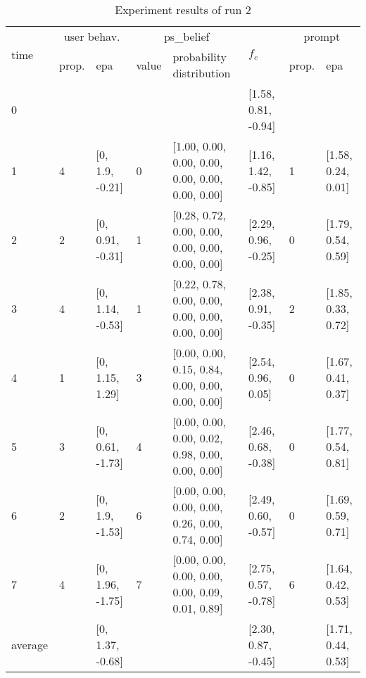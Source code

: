 \begin{table}[htbp]\footnotesize
\caption{Experiment results of run 2}
\begin{tabular}{|p{0.4cm}|p{0.6cm}|l|p{0.6cm}|p{3.3cm}|l|p{0.6cm}|l|}
\hline

\multirow{2}{*}{time} & \multicolumn{2}{c|}{user behav.} & \multicolumn{2}{c|}{ps\_belief} &
\multirow{2}{*}{$f_c$} & \multicolumn{2}{c|}{prompt} \\ \cline{2-5}\cline{ 7- 8}
& prop. & epa & value & probability distribution &  & prop. & epa \\ \hline

0 & \multicolumn{1}{l|}{} &  & \multicolumn{1}{l|}{} &  & [1.58, 0.81, -0.94] & \multicolumn{1}{l|}{} &  \\ \hline
1 & 4 & [0, 1.9, -0.21] & 0 & [1.00, 0.00, 0.00, 0.00, 0.00, 0.00, 0.00, 0.00] & [1.16, 1.42, -0.85] & 1 & [1.58, 0.24, 0.01] \\ \hline
2 & 2 & [0, 0.91, -0.31] & 1 & [0.28, 0.72, 0.00, 0.00, 0.00, 0.00, 0.00, 0.00] & [2.29, 0.96, -0.25] & 0 & [1.79, 0.54, 0.59] \\ \hline
3 & 4 & [0, 1.14, -0.53] & 1 & [0.22, 0.78, 0.00, 0.00, 0.00, 0.00, 0.00, 0.00] & [2.38, 0.91, -0.35] & 2 & [1.85, 0.33, 0.72] \\ \hline
4 & 1 & [0, 1.15, 1.29] & 3 & [0.00, 0.00, 0.15, 0.84, 0.00, 0.00, 0.00, 0.00] & [2.54, 0.96, 0.05] & 0 & [1.67, 0.41, 0.37] \\ \hline
5 & 3 & [0, 0.61, -1.73] & 4 & [0.00, 0.00, 0.00, 0.02, 0.98, 0.00, 0.00, 0.00] & [2.46, 0.68, -0.38] & 0 & [1.77, 0.54, 0.81] \\ \hline
6 & 2 & [0, 1.9, -1.53] & 6 & [0.00, 0.00, 0.00, 0.00, 0.26, 0.00, 0.74, 0.00] & [2.49, 0.60, -0.57] & 0 & [1.69, 0.59, 0.71] \\ \hline
7 & 4 & [0, 1.96, -1.75] & 7 & [0.00, 0.00, 0.00, 0.00, 0.00, 0.09, 0.01, 0.89] & [2.75, 0.57, -0.78] & 6 & [1.64, 0.42, 0.53] \\ \hline
\multicolumn{1}{|l|}{average} & \multicolumn{1}{l|}{} & [0, 1.37, -0.68] & \multicolumn{1}{l|}{} &  & [2.30, 0.87, -0.45] & \multicolumn{1}{l|}{} & [1.71, 0.44, 0.53] \\ \hline
\end{tabular}
\label{}
\end{table}


